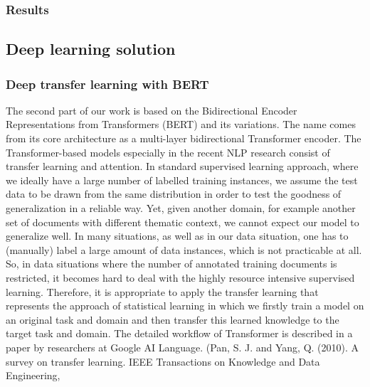 
\subsubsection{Results}
\label{tssa_ml_results}


\subsection{Deep learning solution}
\label{tssa_dl}


\subsubsection{Deep transfer learning with BERT}
\label{bert}

\color{red}

The second part of our work is based on the Bidirectional Encoder 
Representations from Transformers (BERT) and its variations. The name comes from its core architecture as a multi-layer bidirectional Transformer encoder. 
The Transformer-based models especially in the recent NLP research consist of 
transfer learning and attention. In standard supervised learning approach, where 
we ideally have a large number of labelled training instances, we assume the 
test data to be drawn from the same distribution in order to test the goodness 
of generalization in a reliable way. Yet, given another domain, for example 
another set of documents with different thematic context, we cannot expect our 
model to generalize well. 
In many situations, as well as in our data situation, one has to (manually) 
label a large amount of data instances, which is not practicable at all. So, 
in data situations where the number of annotated training documents is 
restricted, it becomes hard to deal with the highly resource intensive 
supervised learning. Therefore, it is appropriate to apply the transfer learning 
that represents the approach of statistical learning in which we firstly train 
a model on an original task and domain and then transfer this learned knowledge 
to the target task and domain. The detailed workflow of Transformer is described 
in a paper by researchers at Google AI Language. 
(Pan, S. J. and Yang, Q. (2010). A survey on transfer learning. 
IEEE Transactions on Knowledge and Data Engineering, 

